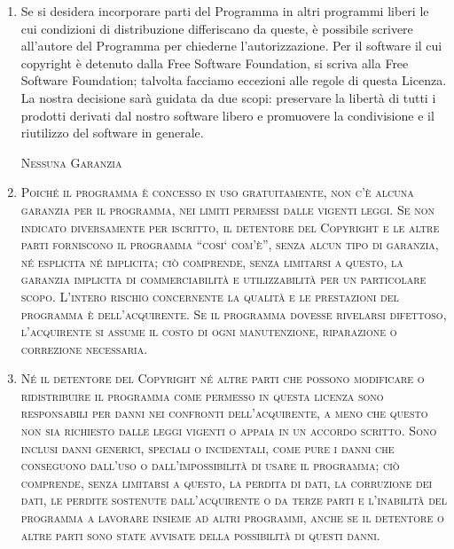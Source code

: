 \begin{enumerate}
\item Se si desidera incorporare parti del Programma in
  altri programmi liberi le cui condizioni di distribuzione
  differiscano da queste, \`e possibile scrivere all'autore
  del Programma per chiederne l'autorizzazione. Per il
  software il cui copyright \`e detenuto dalla Free Software
  Foundation, si scriva alla Free Software Foundation;
  talvolta facciamo eccezioni alle regole di questa Licenza.
  La nostra decisione sar\`a guidata da due scopi:
  preservare la libert\`a di tutti i prodotti derivati dal
  nostro software libero e promuovere la condivisione e il
  riutilizzo del software in generale.

  \begin{center}
    \Large \textsc{Nessuna Garanzia}
  \end{center}

\item \textsc{Poich\'e il programma \`e concesso in uso
    gratuitamente, non c'\`e alcuna garanzia per il
    programma, nei limiti permessi dalle vigenti leggi. Se
    non indicato diversamente per iscritto, il detentore del
    Copyright e le altre parti forniscono il programma
    ``cosi` com'\`e'', senza alcun tipo di garanzia, n\'e
    esplicita n\'e implicita; ci\`o comprende, senza
    limitarsi a questo, la garanzia implicita di
    commerciabilit\`a e utilizzabilit\`a per un particolare
    scopo. L'intero rischio concernente la qualit\`a e le
    prestazioni del programma \`e dell'acquirente. Se il
    programma dovesse rivelarsi difettoso, l'acquirente si
    assume il costo di ogni manutenzione, riparazione o
    correzione necessaria.}

\item \textsc{N\'e il detentore del Copyright n\'e altre
    parti che possono modificare o ridistribuire il
    programma come permesso in questa licenza sono
    responsabili per danni nei confronti dell'acquirente, a
    meno che questo non sia richiesto dalle leggi vigenti o
    appaia in un accordo scritto.  Sono inclusi danni
    generici, speciali o incidentali, come pure i danni che
    conseguono dall'uso o dall'impossibilit\`a di usare il
    programma; ci\`o comprende, senza limitarsi a questo, la
    perdita di dati, la corruzione dei dati, le perdite
    sostenute dall'acquirente o da terze parti e
    l'inabilit\`a del programma a lavorare insieme ad altri
    programmi, anche se il detentore o altre parti sono
    state avvisate della possibilit\`a di questi danni.}
\end{enumerate}

